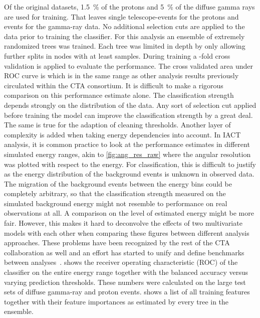 Of the original datasets, \SI{1.5}{\percent} of the protons and \SI{5}{\percent} of the diffuse gamma rays are used for training.
That leaves  single telescope-events for the protons and  
events for the gamma-ray data.
No additional selection cuts are applied to the data prior to training the classifier.
For this analysis an ensemble of  extremely randomized trees was trained.
Each tree was limited in depth by only allowing further splits in nodes with at least  samples. 
During training a -fold cross validation is applied to 
evaluate the performance.
The cross validated area under ROC curve is  which is in the same range as other analysis results previously circulated 
within the CTA consortium. 
It is difficult to make a rigorous comparison on this performance estimate alone. 
The classification strength depends strongly on the distribution of the data. Any sort of selection cut applied before 
training the model can improve the classification strength by a great deal. The same is true for the adaption of cleaning thresholds.
Another layer of complexity is added when taking energy dependencies into account. 
In IACT analysis, it is common practice to look at the performance estimates in different simulated energy ranges, akin to \cref{fig:ang_res_raw}
where the angular resolution was plotted with respect to the energy. For classification, this is difficult to justify as the 
energy distribution of the background events is unknown in observed data.
The migration of the background events between the energy bins could be completely arbitrary, so that the classification strength measured on the 
simulated background energy might not resemble to performance on real observations at all.
A comparison on the level of estimated energy might be more fair. However, this makes it hard to deconvolve the effects 
of two multivariate models with each other when comparing these figures between different analysis approaches.
These problems have been recognized by the rest of the CTA collaboration as well and an effort has started to unify and define benchmarks 
between analyses~\cite{cta_benchmarks}. 
 shows the receiver operating characteristic (ROC) of the classifier on the entire energy range together with the balanced accuracy 
versus varying prediction thresholds.
These numbers were calculated on the large test sets of diffuse gamma-ray and proton events. 
 shows a list of all training features together with their feature importances as estimated by every tree in the ensemble.

